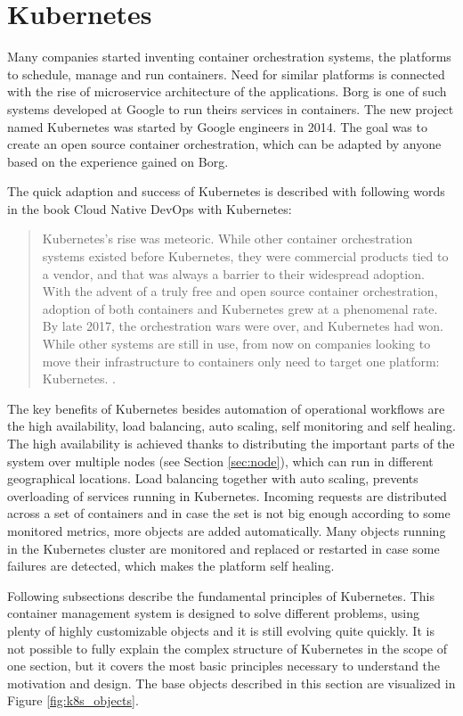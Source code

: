 \documentclass[
  digital, %
  twoside, %
  table,   %
  lof,     %
  lot,     %
]{fithesis3}
\begin{document}
\section{Kubernetes} \label{sec:k8s}
Many companies started inventing container orchestration systems, the platforms to schedule, manage and run containers. Need for similar platforms is connected with the rise of microservice architecture of the applications. Borg \cite{borg} is one of such systems developed at Google to run theirs services in containers. The new project named Kubernetes was started by Google engineers in 2014. The goal was to create an open source container orchestration, which can be adapted by anyone based on the experience gained on Borg.

The quick adaption and success of Kubernetes is described with following words in the book Cloud Native DevOps with Kubernetes:
\begin{quote}
Kubernetes’s rise was meteoric. While other container orchestration systems existed
before Kubernetes, they were commercial products tied to a vendor, and that was
always a barrier to their widespread adoption. With the advent of a truly free and
open source container orchestration, adoption of both containers and Kubernetes grew
at a phenomenal rate.
By late 2017, the orchestration wars were over, and Kubernetes had won. While other
systems are still in use, from now on companies looking to move their infrastructure
to containers only need to target one platform: Kubernetes. \cite[p. 11]{k8s}.
\end{quote}

The key benefits of Kubernetes \cite{k8s_features} besides automation of operational workflows are the high availability, load balancing, auto scaling, self monitoring and self healing. The high availability is achieved thanks to distributing the important parts of the system over multiple nodes (see Section \ref{sec:node}), which can run in different geographical locations. Load balancing together with auto scaling, prevents overloading of services running in Kubernetes. Incoming requests are distributed across a set of containers and in case the set is not big enough according to some monitored metrics, more objects are added automatically. Many objects running in the Kubernetes cluster are monitored and replaced or restarted in case some failures are detected, which makes the platform self healing.

Following subsections describe the fundamental principles of Kubernetes. This container management system is designed to solve different problems, using plenty of highly customizable objects and it is still evolving quite quickly. It is not possible to fully explain the complex structure of Kubernetes in the scope of one section, but it covers the most basic principles necessary to understand the motivation and design. The base objects described in this section are visualized in Figure \ref{fig:k8s_objects}.
\end{document}
